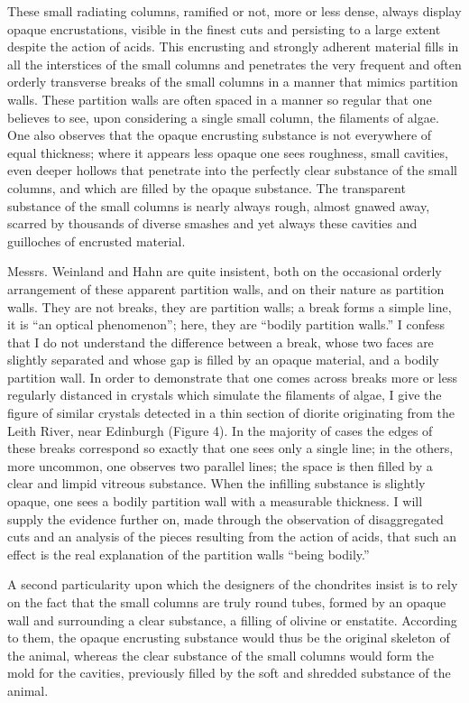 \documentclass[a4paper, 12pt, oneside]{article}
\begin{document}
These small radiating columns, ramified or not, more or less dense, always display opaque encrustations, visible in the finest cuts and persisting to a large extent despite the action of acids. This encrusting and strongly adherent material fills in all the interstices of the small columns and penetrates the very frequent and often orderly transverse breaks of the small columns in a manner that mimics partition walls. These partition walls are often spaced in a manner so regular that one believes to see, upon considering a single small column, the filaments of algae. One also observes that the opaque encrusting substance is not everywhere of equal thickness; where it appears less opaque one sees roughness, small cavities, even deeper hollows that penetrate into the perfectly clear substance of the small columns, and which are filled by the opaque substance. The transparent substance of the small columns is nearly always rough, almost gnawed away, scarred by thousands of diverse smashes and yet always these cavities and guilloches of encrusted material.

Messrs. Weinland and Hahn are quite insistent, both on the occasional orderly arrangement of these apparent partition walls, and on their nature as partition walls. They are not breaks, they are partition walls; a break forms a simple line, it is ``an optical phenomenon''; here, they are ``bodily partition walls.'' I confess that I do not understand the difference between a break, whose two faces are slightly separated and whose gap is filled by an opaque material, and a bodily partition wall. In order to demonstrate that one comes across breaks more or less regularly distanced in crystals which simulate the filaments of algae, I give the figure of similar crystals detected in a thin section of diorite originating from the Leith River, near Edinburgh (Figure 4). In the majority of cases the edges of these breaks correspond so exactly that one sees only a single line; in the others, more uncommon, one observes two parallel lines; the space is then filled by a clear and limpid vitreous substance. When the infilling substance is slightly opaque, one sees a bodily partition wall with a measurable thickness. I will supply the evidence further on, made through the observation of disaggregated cuts and an analysis of the pieces resulting from the action of acids, that such an effect is the real explanation of the partition walls ``being bodily.''

A second particularity upon which the designers of the chondrites insist is to rely on the fact that the small columns are truly round tubes, formed by an opaque wall and surrounding a clear substance, a filling of olivine or enstatite. According to them, the opaque encrusting substance would thus be the original skeleton of the animal, whereas the clear substance of the small columns would form the mold for the cavities, previously filled by the soft and shredded substance of the animal.
\end{document}
